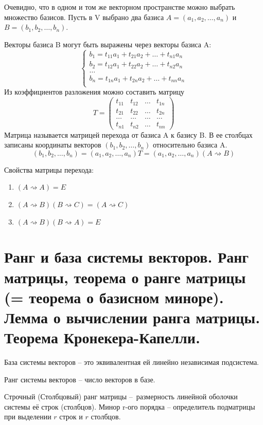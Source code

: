 \documentclass{article}
\begin{document}
Очевидно, что в одном и том же векторном пространстве можно выбрать множество базисов. Пусть в V выбрано два базиса $A=(a_1,a_2,\dots,a_n)$ и $B=(b_1,b_2,\dots,b_n)$.

Векторы базиса B могут быть выражены через векторы базиса A:
\begin{equation*}
    \begin{cases}
        b_1=t_{11}a_1+t_{21}a_2+\dots+t_{n1}a_n \\
        b_2=t_{12}a_1+t_{22}a_2+\dots+t_{n2}a_n \\
        \dots \\
        b_n=t_{1n}a_1+t_{2n}a_2+\dots+t_{nn}a_n \\
    \end{cases}
\end{equation*}
Из коэффициентов разложения можно составить матрицу $$T=
\begin{pmatrix}
    t_{11} & t_{12} & \dots & t_{1n} \\
    t_{21} & t_{22} & \dots & t_{2n} \\
    \dots & \dots & \dots & \dots \\
    t_{n1} & t_{n2} & \dots & t_{nn}
\end{pmatrix}
$$
Матрица называется \textsf{матрицей перехода} от базиса A к базису B. В ее столбцах записаны координаты векторов $(b_1,b_2,\dots,b_n)$ относительно базиса A.
$$(b_1,b_2,\dots,b_n)=(a_1,a_2,\dots,a_n)T=(a_1,a_2,\dots,a_n)(A\rightsquigarrow B)$$

Свойства матрицы перехода:
\begin{enumerate}
    \item $(A\rightsquigarrow A)=E$
    \item $(A\rightsquigarrow B)(B\rightsquigarrow C)=(A\rightsquigarrow C)$
    \item $(A\rightsquigarrow B)(B\rightsquigarrow A)=E$
\end{enumerate}

\section{Ранг и база системы векторов. Ранг матрицы, теорема о ранге матрицы (= теорема о базисном миноре). Лемма о вычислении ранга матрицы. Теорема Кронекера-Капелли.}
\textsf{База} системы векторов – это эквивалентная ей линейно независимая подсистема.

\textsf{Ранг} системы векторов – число векторов в базе.

Строчный (Столбцовый) ранг матрицы – размерность линейной оболочки системы её строк (столбцов). Минор r-ого порядка – определитель подматрицы при выделении $r$ строк и $r$ столбцов.
\end{document}
